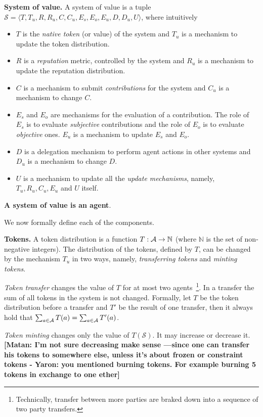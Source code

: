 \documentclass[10pt]{llncs}
\newcommand{\nat}{\mathbb{N}}
\newcommand{\MyComment}[1]{{\textbf{\color{blue} [Matan: #1]}}}
\begin{document}
\noindent \textbf{System of value.}
\newcommand{\SysValue}{\mathcal{S}}
A system of value is a tuple $\SysValue = \langle T, T_u, R, R_u, C, C_u, E_s, E_o, E_u, D, D_u, U \rangle$, where
intuitively
\begin{itemize}
\item $T$ is the \emph{native token} (or value) of the system and $T_u$ is a mechanism to update the token distribution.
\item $R$ is a \emph{reputation} metric, controlled by the system and $R_u$ is a mechanism to update the reputation distribution.
\item $C$ is a mechanism to submit \emph{contributions} for the system and $C_u$ is a mechanism to change $C$.
\item $E_s$ and $E_o$ are mechanisms for the evaluation of a contribution. The role of $E_s$ is to evaluate \emph{subjective} contributions and the role of $E_o$ is to evaluate \emph{objective} ones. $E_u$ is a mechanism to update $E_s$ and $E_o$.
\item $D$ is a delegation mechanism to perform agent actions in other systems and $D_u$ is a mechanism to change $D$.
\item $U$ is a mechanism to update all the \emph{update mechanisms}, namely, $T_u, R_u, C_u, E_u$ and $U$ itself.
\end{itemize}
\textbf{A system of value is an agent}.


We now formally define each of the components.

\noindent \textbf{Tokens.}
A token distribution is a function $T:\Agents\to \nat$ (where $\nat$ is the set of non-negative integers).
The distribution of the tokens, defined by $T$, can be changed by the mechanism $T_u$ in two ways, namely, \emph{transferring tokens} and \emph{minting tokens}.


\emph{Token transfer} changes the value of $T$ for at most two agents~\footnote{Technically, transfer between more parties are braked down into a sequence of two party transfers.}.
In a transfer the sum of all tokens in the system is not changed.
Formally, let $T$ be the token distribution before a transfer and $T'$ be the result of one transfer, then it always hold that $\sum_{a\in\mathcal{A}} T(a) = \sum_{a\in\mathcal{A}} T'(a)$.

\emph{Token minting} changes only the value of $T(\SysValue)$. It may increase or decrease it. \MyComment{I'm not sure decreasing make sense —since one can transfer his tokens to somewhere else, unless it's about frozen or constraint tokens - Yaron: you mentioned burning tokens. For example burning 5 tokens in exchange to one ether}
\end{document}
